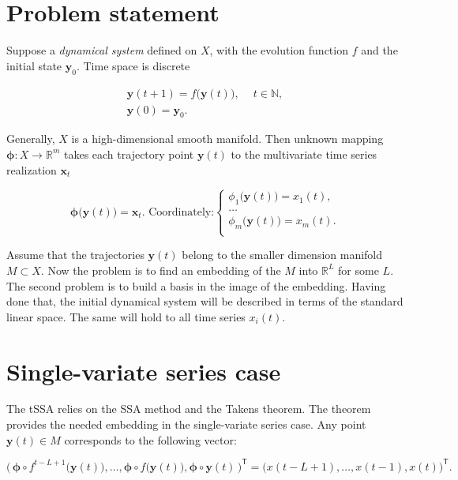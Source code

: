 \documentclass[referee, pdflatex, sn-mathphys-num]{sn-jnl}
\theoremstyle{definition}
\theoremstyle{plain}
\begin{document}
	\section{Problem statement}\label{sec:problem_statement}
	
	Suppose a \emph{dynamical system} defined on $ X $, with the evolution function $ f $ and the initial state $ \mathbf{y}_0 $. Time space is discrete
	
	\begin{gather*}
		\mathbf{y}(t + 1) = f \bigl( \mathbf{y}(t) \bigr), \quad \ t \in \mathbb{N}, \\
		\mathbf{y}(0) = \mathbf{y}_0 .
	\end{gather*}
	
	Generally, $ X $ is a high-dimensional smooth manifold. Then unknown mapping $ \boldsymbol{\phi}: X \to \mathbb{R}^m $ takes each trajectory point $ \mathbf{y}(t) $ to the multivariate time series realization $ \mathbf{x}_t $
	
	\begin{equation*}
		\boldsymbol{\phi} \bigl( \mathbf{y}(t) \bigr) = \mathbf{x}_t. \text{ Coordinately:} \begin{cases}
			\phi_1 \bigl( \mathbf{y}(t) \bigr) = x_1(t), \\
			\ldots \\
			\phi_m \bigl( \mathbf{y}(t) \bigr) = x_m(t). \\
		\end{cases}
	\end{equation*}
	
	Assume that the trajectories $ \mathbf{y}(t) $ belong to the smaller dimension manifold $ M \subset X $. Now the problem is to find an embedding of the $ M $ into $ \mathbb{R}^{L} $ for some $ L $. The second problem is to build a basis in the image of the embedding. Having done that, the initial dynamical system will be described in terms of the standard linear space. The same will hold to all time series $ x_i(t) $.

	\section{Single-variate series case}\label{sec:one_series}
	
	The tSSA relies on the SSA method and the Takens theorem. The theorem provides the needed embedding in the single-variate series case. Any point $ \mathbf{y}(t) \in M $ corresponds to the following vector:
	
	\begin{equation*}
		\bigl( \, \boldsymbol{\phi} \circ f^{t - L + 1} \bigl( \mathbf{y}(t) \bigr), \ldots , \boldsymbol{\phi} \circ f \bigl( \mathbf{y}(t) \bigr), \boldsymbol{\phi} \circ \mathbf{y}(t) \, \bigr)^{\mathsf{T}} = \bigl( x(t - L + 1), \ldots , x(t-1), x(t) \bigr)^{\mathsf{T}}.
	\end{equation*}
	
\end{document}
